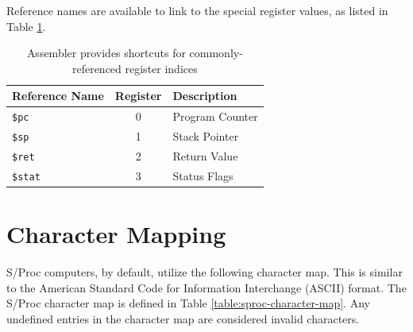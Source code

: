\documentclass{article}
\begin{document}
Reference names are available to link to the special register values, as listed in Table \ref{table:assembler-register-references}.

\begin{table}[h!]
	\centering
	\begin{tabular}{l|cl}
		\hline
		Reference Name & Register & Description \\
		\hline
		\texttt{\$pc} & 0 & Program Counter \\
		\texttt{\$sp} & 1 & Stack Pointer \\
		\texttt{\$ret} & 2 & Return Value \\
		\texttt{\$stat} & 3 & Status Flags \\
		\hline
	\end{tabular}
	\caption{Assembler provides shortcuts for commonly-referenced register indices}
	\label{table:assembler-register-references}
\end{table}

\pagebreak

\section{Character Mapping}
\label{sec:character-map}

S/Proc computers, by default, utilize the following character map. This is similar to the American Standard Code for Information Interchange (ASCII) format. The S/Proc character map is defined in Table \ref{table:sproc-character-map}. Any undefined entries in the character map are considered invalid characters.

\newcommand{\charmap}[1]{\texttt{#1}}

\newcommand{\charslash}{\texttt{\char`\\}}

\newcommand{\charmapescape}[1]{\charmap{\texttt{\charslash#1}}}
\end{document}
